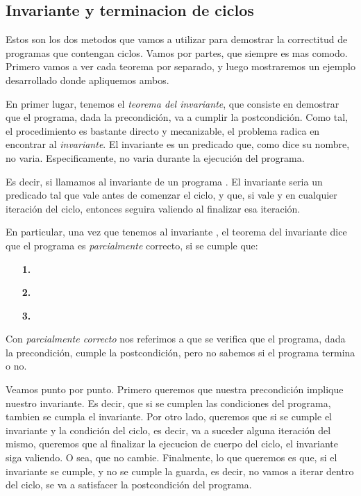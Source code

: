 \documentclass{article}
\begin{document}
\subsection{Invariante y terminacion de ciclos}

Estos son los dos metodos que vamos a utilizar para demostrar la correctitud de programas que contengan ciclos. Vamos por partes, que siempre es mas comodo. Primero vamos a ver cada teorema por separado, y luego mostraremos un ejemplo desarrollado donde apliquemos ambos.

En primer lugar, tenemos el \textit{teorema del invariante}, que consiste en demostrar que el programa, dada la precondición, va a cumplir la postcondición. Como tal, el procedimiento es bastante directo y mecanizable, el problema radica en encontrar al \textit{invariante}. El invariante es un predicado que, como dice su nombre, no varia. Especificamente, no varia durante la ejecución del programa.

Es decir, si llamamos  al invariante de un programa . El invariante seria un predicado tal que  vale antes de comenzar el ciclo, y que, si vale  y  en cualquier iteración del ciclo, entonces  seguira valiendo al finalizar esa iteración.

En particular, una vez que tenemos al invariante , el teorema del invariante dice que el programa es \textit{parcialmente} correcto, si se cumple que:

\begin{itemize}
	\item[\textbf{1.}] 
	\item[\textbf{2.}] 
	\item[\textbf{3.}] 
\end{itemize}

Con \textit{parcialmente correcto} nos referimos a que se verifica que el programa, dada la precondición, cumple la postcondición, pero no sabemos si el programa termina o no.

Veamos punto por punto. Primero queremos que nuestra precondición implique nuestro invariante. Es decir, que si se cumplen las condiciones del programa, tambien se cumpla el invariante. Por otro lado, queremos que si se cumple el invariante y la condición del ciclo, es decir, va a suceder alguna iteración del mismo, queremos que al finalizar la ejecucion de cuerpo del ciclo, el invariante siga valiendo. O sea, que no cambie. Finalmente, lo que queremos es que, si el invariante se cumple, y no se cumple la guarda, es decir, no vamos a iterar dentro del ciclo, se va a satisfacer la postcondición del programa.
\end{document}
